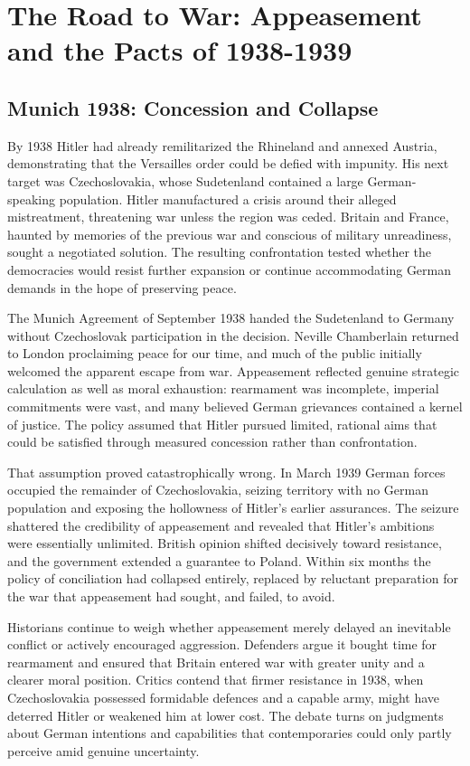 \section{The Road to War: Appeasement and the Pacts of 1938-1939}

\subsection{Munich 1938: Concession and Collapse}
By 1938 Hitler had already remilitarized the Rhineland and annexed Austria, demonstrating that the Versailles order could be defied with impunity. His next target was Czechoslovakia, whose Sudetenland contained a large German-speaking population. Hitler manufactured a crisis around their alleged mistreatment, threatening war unless the region was ceded. Britain and France, haunted by memories of the previous war and conscious of military unreadiness, sought a negotiated solution. The resulting confrontation tested whether the democracies would resist further expansion or continue accommodating German demands in the hope of preserving peace.

The Munich Agreement of September 1938 handed the Sudetenland to Germany without Czechoslovak participation in the decision. Neville Chamberlain returned to London proclaiming peace for our time, and much of the public initially welcomed the apparent escape from war. Appeasement reflected genuine strategic calculation as well as moral exhaustion: rearmament was incomplete, imperial commitments were vast, and many believed German grievances contained a kernel of justice. The policy assumed that Hitler pursued limited, rational aims that could be satisfied through measured concession rather than confrontation.

That assumption proved catastrophically wrong. In March 1939 German forces occupied the remainder of Czechoslovakia, seizing territory with no German population and exposing the hollowness of Hitler's earlier assurances. The seizure shattered the credibility of appeasement and revealed that Hitler's ambitions were essentially unlimited. British opinion shifted decisively toward resistance, and the government extended a guarantee to Poland. Within six months the policy of conciliation had collapsed entirely, replaced by reluctant preparation for the war that appeasement had sought, and failed, to avoid.

Historians continue to weigh whether appeasement merely delayed an inevitable conflict or actively encouraged aggression. Defenders argue it bought time for rearmament and ensured that Britain entered war with greater unity and a clearer moral position. Critics contend that firmer resistance in 1938, when Czechoslovakia possessed formidable defences and a capable army, might have deterred Hitler or weakened him at lower cost. The debate turns on judgments about German intentions and capabilities that contemporaries could only partly perceive amid genuine uncertainty.

